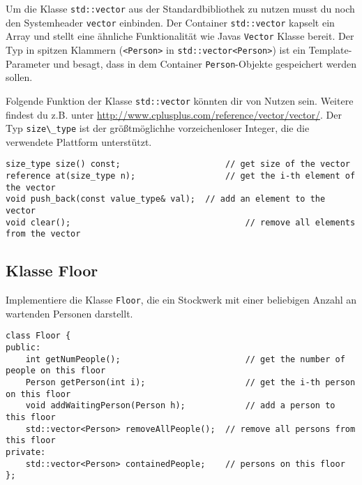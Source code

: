 Um die Klasse \lstinline{std::vector} aus der Standardbibliothek zu nutzen musst du noch den Systemheader \lstinline{vector} einbinden.
Der Container \lstinline{std::vector} kapselt ein Array und stellt eine ähnliche Funktionalität wie Javas \lstinline{Vector} Klasse bereit.
Der Typ in spitzen Klammern (\lstinline{<Person>} in \lstinline{std::vector<Person>}) ist ein Template-Parameter und besagt, dass in dem Container \lstinline{Person}-Objekte gespeichert werden sollen.

Folgende Funktion der Klasse \lstinline{std::vector} könnten dir von Nutzen sein. Weitere findest du z.B. unter \url{http://www.cplusplus.com/reference/vector/vector/}. Der Typ \lstinline{size\_type} ist der größtmöglichhe vorzeichenloser Integer, die die verwendete Plattform unterstützt.

\begin{lstlisting}
size_type size() const;						// get size of the vector
reference at(size_type n);					// get the i-th element of the vector
void push_back(const value_type& val);	// add an element to the vector
void clear();									// remove all elements from the vector
\end{lstlisting}


\subsection{Klasse Floor}
Implementiere die Klasse \lstinline{Floor}, die ein Stockwerk mit einer beliebigen Anzahl an wartenden Personen darstellt.

\begin{lstlisting}
class Floor {
public:
	int getNumPeople();							// get the number of people on this floor
	Person getPerson(int i);					// get the i-th person on this floor
	void addWaitingPerson(Person h);			// add a person to this floor
	std::vector<Person> removeAllPeople();	// remove all persons from this floor
private:
	std::vector<Person> containedPeople;	// persons on this floor
};
\end{lstlisting}


